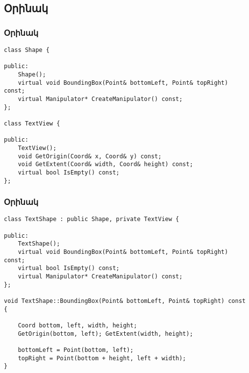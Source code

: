 \documentclass{beamer}
\begin{document}
\subsection{Օրինակ}
\begin{frame}[fragile]\frametitle{Օրինակ}
\begin{english}
\begin{verbatim}
class Shape {

public:
    Shape();
    virtual void BoundingBox(Point& bottomLeft, Point& topRight) const;
    virtual Manipulator* CreateManipulator() const;
};

class TextView {

public:
    TextView();
    void GetOrigin(Coord& x, Coord& y) const;
    void GetExtent(Coord& width, Coord& height) const;
    virtual bool IsEmpty() const;
};
\end{verbatim}
\end{english}
\end{frame}

\begin{frame}[fragile]\frametitle{Օրինակ}
\begin{english}
\begin{verbatim}
class TextShape : public Shape, private TextView {

public:
    TextShape();
    virtual void BoundingBox(Point& bottomLeft, Point& topRight) const;
    virtual bool IsEmpty() const;
    virtual Manipulator* CreateManipulator() const;
};

void TextShape::BoundingBox(Point& bottomLeft, Point& topRight) const {

    Coord bottom, left, width, height;
    GetOrigin(bottom, left); GetExtent(width, height);

    bottomLeft = Point(bottom, left);
    topRight = Point(bottom + height, left + width);
}
\end{verbatim}
\end{english}
\end{frame}
\end{document}
